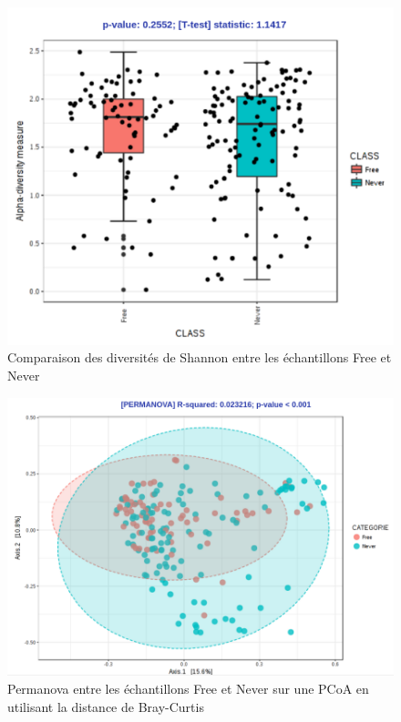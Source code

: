 \documentclass[12pt,a4paper]{article}
\begin{document}
\begin{figure}
\begin{center}
\includegraphics[scale=0.70]{img/compare.png}\hfill
\end{center}
\caption{Comparaison des diversités de Shannon entre les échantillons Free et Never}
\label{compare}
\end{figure}


\begin{figure}[t]
\begin{center}
\includegraphics[scale=0.50]{img/pcoa.png}\hfill
\end{center}
\caption{Permanova entre les échantillons Free et Never sur une PCoA en utilisant la distance de Bray-Curtis}
\label{pcoa}
\end{figure}
\end{document}
